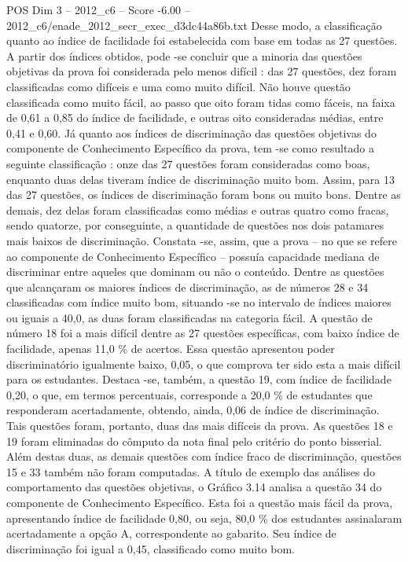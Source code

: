 \begin{textsample}{POS Dim 3 – 2012\_c6 – Score -6.00 – 2012\_c6/enade\_2012\_secr\_exec\_d3dc44a86b.txt}
Desse modo, a classificação quanto ao índice de facilidade foi estabelecida com base em todas as 27 questões.
A partir dos índices obtidos, pode -se concluir que a minoria das questões objetivas da prova foi considerada pelo menos difícil : das 27 questões, dez foram classificadas como difíceis e uma como muito difícil.
Não houve questão classificada como muito fácil, ao passo que oito foram tidas como fáceis, na faixa de 0,61 a 0,85 do índice de facilidade, e outras oito consideradas médias, entre 0,41 e 0,60.
Já quanto aos índices de discriminação das questões objetivas do componente de Conhecimento Específico da prova, tem -se como resultado a seguinte classificação : onze das 27 questões foram consideradas como boas, enquanto duas delas tiveram índice de discriminação muito bom.
Assim, para 13 das 27 questões, os índices de discriminação foram bons ou muito bons.
Dentre as demais, dez delas foram classificadas como médias e outras quatro como fracas, sendo quatorze, por conseguinte, a quantidade de questões nos dois patamares mais baixos de discriminação.
Constata -se, assim, que a prova – no que se refere ao componente de Conhecimento Específico – possuía capacidade mediana de discriminar entre aqueles que dominam ou não o conteúdo.
Dentre as questões que alcançaram os maiores índices de discriminação, as de números 28 e 34 classificadas com índice muito bom, situando -se no intervalo de índices maiores ou iguais a 40,0, as duas foram classificadas na categoria fácil.
A questão de número 18 foi a mais difícil dentre as 27 questões específicas, com baixo índice de facilidade, apenas 11,0 \% de acertos.
Essa questão apresentou poder discriminatório igualmente baixo, 0,05, o que comprova ter sido esta a mais difícil para os estudantes.
Destaca -se, também, a questão 19, com índice de facilidade 0,20, o que, em termos percentuais, corresponde a 20,0 \% de estudantes que responderam acertadamente, obtendo, ainda, 0,06 de índice de discriminação.
Tais questões foram, portanto, duas das mais difíceis da prova.
As questões 18 e 19 foram eliminadas do cômputo da nota final pelo critério do ponto bisserial.
Além destas duas, as demais questões com índice fraco de discriminação, questões 15 e 33 também não foram computadas.
A título de exemplo das análises do comportamento das questões objetivas, o Gráfico 3.14 analisa a questão 34 do componente de Conhecimento Específico.
Esta foi a questão mais fácil da prova, apresentando índice de facilidade 0,80, ou seja, 80,0 \% dos estudantes assinalaram acertadamente a opção A, correspondente ao gabarito.
Seu índice de discriminação foi igual a 0,45, classificado como muito bom.

\end{textsample}

